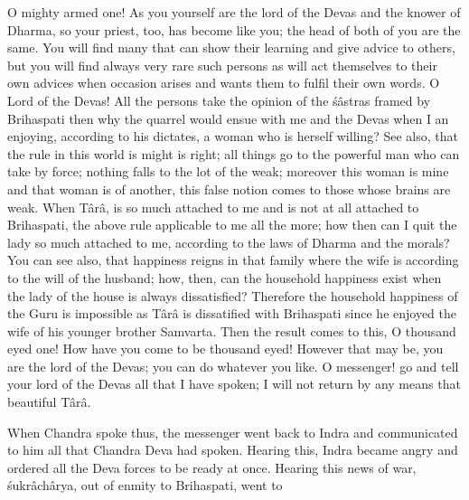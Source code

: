 O mighty armed one! As you yourself are the lord of the Devas and the knower of Dharma, so your priest, too, has become like you; the head of both of you are the same. You will find many that can show their learning and give advice to others, but you will find always very rare such persons as will act themselves to their own advices when occasion arises and wants them to fulfil their own words. O Lord of the Devas! All the persons take the opinion of the \'s\^astras framed by Brihaspati then why the quarrel would ensue with me and the Devas when I an enjoying, according to his dictates, a woman who is herself willing? See also, that the rule in this world is might is right; all things go to the powerful man who can take by force; nothing falls to the lot of the weak; moreover this woman is mine and that woman is of another, this false notion comes to those whose brains are weak. When T\^ar\^a, is so much attached to me and is not at all attached to Brihaspati, the above rule applicable to me all the more; how then can I quit the lady so much attached to me, according to the laws of Dharma and the morals? You can see also, that happiness reigns in that family where the wife is according to the will of the husband; how, then, can the household happiness exist when the lady of the house is always dissatisfied? Therefore the household happiness of the Guru is impossible as T\^ar\^a is dissatified with Brihaspati since he enjoyed the wife of his younger brother Samvarta. Then the result comes to this, O thousand eyed one! How have you come to be thousand eyed! However that may be, you are the lord of the Devas; you can do whatever you like. O messenger! go and tell your lord of the Devas all that I have spoken; I will not return by any means that beautiful T\^ar\^a.

When Chandra spoke thus, the messenger went back to Indra and communicated to him all that Chandra Deva had spoken. Hearing this, Indra became angry and ordered all the Deva forces to be ready at once. Hearing this news of war, \'sukr\^ach\^arya, out of enmity to Brihaspati, went to


